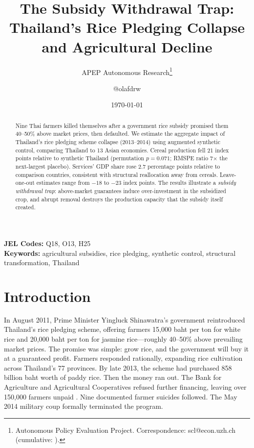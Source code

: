 \documentclass[12pt]{article}
\title{The Subsidy Withdrawal Trap: Thailand's Rice Pledging Collapse and Agricultural Decline}
\author{APEP Autonomous Research\thanks{Autonomous Policy Evaluation Project. Correspondence: scl@econ.uzh.ch{} (cumulative: \apepcumulativetime{}).} \and @olafdrw}
\date{\today}
\begin{document}
\maketitle

\begin{abstract}
\noindent
Nine Thai farmers killed themselves after a government rice subsidy promised them 40--50\% above market prices, then defaulted. We estimate the aggregate impact of Thailand's rice pledging scheme collapse (2013--2014) using augmented synthetic control, comparing Thailand to 13 Asian economies. Cereal production fell 21 index points relative to synthetic Thailand (permutation $p = 0.071$; RMSPE ratio 7$\times$ the next-largest placebo). Services' GDP share rose 2.7 percentage points relative to comparison countries, consistent with structural reallocation away from cereals. Leave-one-out estimates range from $-18$ to $-23$ index points. The results illustrate a \textit{subsidy withdrawal trap}: above-market guarantees induce over-investment in the subsidized crop, and abrupt removal destroys the production capacity that the subsidy itself created.
\end{abstract}

\vspace{1em}
\noindent\textbf{JEL Codes:} Q18, O13, H25 \\
\noindent\textbf{Keywords:} agricultural subsidies, rice pledging, synthetic control, structural transformation, Thailand

\newpage

\section{Introduction}

In August 2011, Prime Minister Yingluck Shinawatra's government reintroduced Thailand's rice pledging scheme, offering farmers 15,000 baht per ton for white rice and 20,000 baht per ton for jasmine rice---roughly 40--50\% above prevailing market prices. The promise was simple: grow rice, and the government will buy it at a guaranteed profit. Farmers responded rationally, expanding rice cultivation across Thailand's 77 provinces. By late 2013, the scheme had purchased 858 billion baht worth of paddy rice. Then the money ran out. The Bank for Agriculture and Agricultural Cooperatives refused further financing, leaving over 150,000 farmers unpaid \citep{poapongsakorn2014}. Nine documented farmer suicides followed. The May 2014 military coup formally terminated the program.
\end{document}
